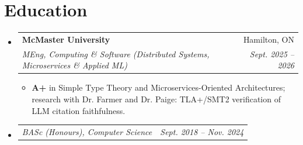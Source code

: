 \documentclass[letterpaper,11pt]{article}
\makeatletter
\newcommand{\resumeItem}[1]{
  \item\small{
    {#1\vspace{-2pt}}
  }
}
\newcommand{\resumeSubheading}[4]{
  \vspace{-2pt}\item
    \begin{tabular*}{0.97\textwidth}[t]{l@{\extracolsep{\fill}}r}
      \textbf{#1} & #2 \\
      \textit{\small#3} & \textit{\small #4} \\
    \end{tabular*}\vspace{-7pt}
}
\newcommand{\resumeSubSubheading}[2]{
    \item
    \begin{tabular*}{0.97\textwidth}{l@{\extracolsep{\fill}}r}
      \textit{\small#1} & \textit{\small #2} \\
    \end{tabular*}\vspace{-7pt}
}
\newcommand{\resumeSubHeadingListStart}{\begin{itemize}[leftmargin=0.15in, label={}]}
\newcommand{\resumeSubHeadingListEnd}{\end{itemize}}
\newcommand{\resumeItemListStart}{\begin{itemize}}
\newcommand{\resumeItemListEnd}{\end{itemize}\vspace{-5pt}}
\makeatother
\begin{document}
\section{Education}
  \resumeSubHeadingListStart
    \resumeSubheading
      {McMaster University}{Hamilton, ON}
      {MEng, Computing \& Software (Distributed Systems, Microservices \& Applied ML)}{Sept. 2025 -- 2026}
      \resumeItemListStart
        \resumeItem{\textbf{A+} in Simple Type Theory and Microservices-Oriented Architectures; research with Dr. Farmer and Dr. Paige: TLA+/SMT2 verification of LLM citation faithfulness.}
      \resumeItemListEnd
    \resumeSubSubheading
      {BASc (Honours), Computer Science}{Sept. 2018 -- Nov. 2024}
  \resumeSubHeadingListEnd
\end{document}
